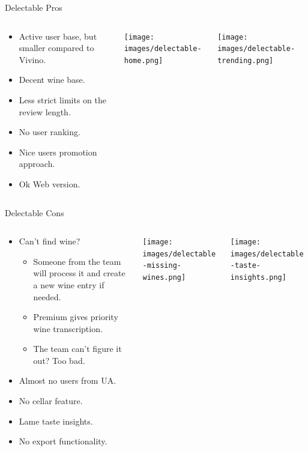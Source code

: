 \documentclass[presentation,aspectratio=169,smaller]{beamer}
\begin{document}
\begin{frame}[label={sec:org9dd831a}]{Delectable Pros}
\begin{columns}
\begin{column}{0.5\columnwidth}
\begin{itemize}
\item Active user base, but smaller compared to Vivino.
\item Decent wine base.
\item Less strict limits on the review length.
\item No user ranking.
\item Nice users promotion approach.
\item Ok Web version.
\end{itemize}
\end{column}
\begin{column}{0.25\columnwidth}
\begin{center}
\texttt{[image: images/delectable-home.png]}
\end{center}
\end{column}
\begin{column}{0.25\columnwidth}
\begin{center}
\texttt{[image: images/delectable-trending.png]}
\end{center}
\end{column}
\end{columns}
\end{frame}
\begin{frame}[label={sec:orge8f9f3c}]{Delectable Cons}
\begin{columns}
\begin{column}{0.5\columnwidth}
\begin{itemize}
\item Can't find wine?
\begin{itemize}
\item Someone from the team will process it and create a new wine entry if needed.
\item Premium gives priority wine transcription.
\item The team can't figure it out? Too bad.
\end{itemize}
\item Almost no users from UA.
\item No cellar feature.
\item Lame taste insights.
\item No export functionality.
\end{itemize}
\end{column}
\begin{column}{0.25\columnwidth}
\begin{center}
\texttt{[image: images/delectable-missing-wines.png]}
\end{center}
\end{column}
\begin{column}{0.25\columnwidth}
\begin{center}
\texttt{[image: images/delectable-taste-insights.png]}
\end{center}
\end{column}
\end{columns}
\end{frame}
\end{document}
